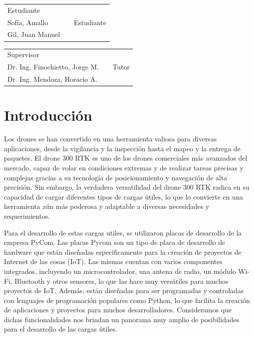\documentclass[12pt]{article}
\begin{document}
\vspace{1.5cm}
\begin{tabular}{p{5.5cm}cp{5.5cm}}
  \cline{1-1} \cline{3-3} \\
  \centering Estudiante   \\ Sofía, Amallo && \centering Estudiante \\ Gil, Juan Manuel
\end{tabular}

\vspace{1.5cm}

\begin{tabular}{p{5.5cm}cp{5.5cm}}
  \cline{1-1} \cline{3-3} \\
  \centering Supervisor   \\ Dr. Ing. Finochietto, Jorge M. && \centering Tutor \\ Dr. Ing. Mendoza, Horacio A.
\end{tabular}

\setlength\parindent{24pt}
\newpage
\section{Introducción}

Los drones se han convertido en una herramienta valiosa para diversas aplicaciones, desde la vigilancia y la inspección hasta el mapeo y la entrega de paquetes. El drone 300 RTK es uno de los drones comerciales más avanzados del mercado, capaz de volar en condiciones extremas y de realizar tareas precisas y complejas gracias a su tecnología de posicionamiento y navegación de alta precisión. Sin embargo, la verdadera versatilidad del drone 300 RTK radica en su capacidad de cargar diferentes tipos de cargas útiles, lo que lo convierte en una herramienta aún más poderosa y adaptable a diversas necesidades y requerimientos.

Para el desarrollo de estas cargas utiles, se utilizaron placas de desarrollo de la empresa PyCom. Las placas Pycom son un tipo de placa de desarrollo de hardware que están diseñadas específicamente para la creación de proyectos de Internet de las cosas (IoT). Las mismas cuentan con varios componentes integrados, incluyendo un microcontrolador, una antena de radio, un módulo Wi-Fi, Bluetooth y otros sensores, lo que las hace muy versátiles para muchos proyectos de IoT. Además, están diseñadas para ser programadas y controladas con lenguajes de programación populares como Python, lo que facilita la creación de aplicaciones y proyectos para muchos desarrolladores. Consideramos que dichas funcionalidades nos brindan un panorama muy amplio de posibilidades para el desarrollo de las cargas útiles.
\end{document}
